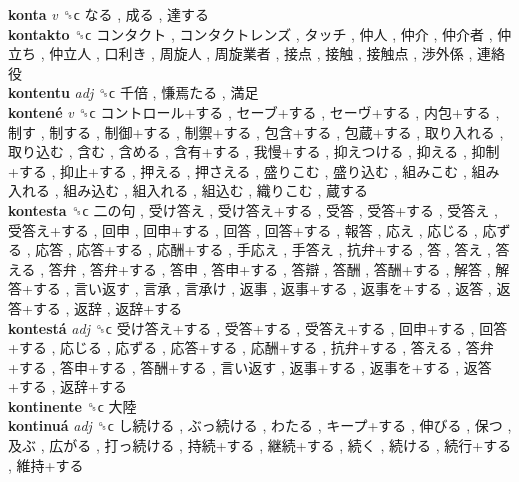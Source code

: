 \textbf{konta} \emph{v}  ␝ϲ   なる ,  成る ,  達する   \\
\textbf{kontakto} ␝ϲ   コンタクト ,  コンタクトレンズ ,  タッチ ,  仲人 ,  仲介 ,  仲介者 ,  仲立ち ,  仲立人 ,  口利き ,  周旋人 ,  周旋業者 ,  接点 ,  接触 ,  接触点 ,  渉外係 ,  連絡役   \\
\textbf{kontentu} \emph{adj}  ␝ϲ   千倍 ,  慊焉たる ,  満足   \\
\textbf{kontené} \emph{v}  ␝ϲ   コントロール+する ,  セーブ+する ,  セーヴ+する ,  内包+する ,  制す ,  制する ,  制御+する ,  制禦+する ,  包含+する ,  包蔵+する ,  取り入れる ,  取り込む ,  含む ,  含める ,  含有+する ,  我慢+する ,  抑えつける ,  抑える ,  抑制+する ,  抑止+する ,  押える ,  押さえる ,  盛りこむ ,  盛り込む ,  組みこむ ,  組み入れる ,  組み込む ,  組入れる ,  組込む ,  織りこむ ,  蔵する   \\
\textbf{kontesta} ␝ϲ   二の句 ,  受け答え ,  受け答え+する ,  受答 ,  受答+する ,  受答え ,  受答え+する ,  回申 ,  回申+する ,  回答 ,  回答+する ,  報答 ,  応え ,  応じる ,  応ずる ,  応答 ,  応答+する ,  応酬+する ,  手応え ,  手答え ,  抗弁+する ,  答 ,  答え ,  答える ,  答弁 ,  答弁+する ,  答申 ,  答申+する ,  答辯 ,  答酬 ,  答酬+する ,  解答 ,  解答+する ,  言い返す ,  言承 ,  言承け ,  返事 ,  返事+する ,  返事を+する ,  返答 ,  返答+する ,  返辞 ,  返辞+する   \\
\textbf{kontestá} \emph{adj}  ␝ϲ   受け答え+する ,  受答+する ,  受答え+する ,  回申+する ,  回答+する ,  応じる ,  応ずる ,  応答+する ,  応酬+する ,  抗弁+する ,  答える ,  答弁+する ,  答申+する ,  答酬+する ,  言い返す ,  返事+する ,  返事を+する ,  返答+する ,  返辞+する   \\
\textbf{kontinente} ␝ϲ   大陸   \\
\textbf{kontinuá} \emph{adj}  ␝ϲ   し続ける ,  ぶっ続ける ,  わたる ,  キープ+する ,  伸びる ,  保つ ,  及ぶ ,  広がる ,  打っ続ける ,  持続+する ,  継続+する ,  続く ,  続ける ,  続行+する ,  維持+する   \\
